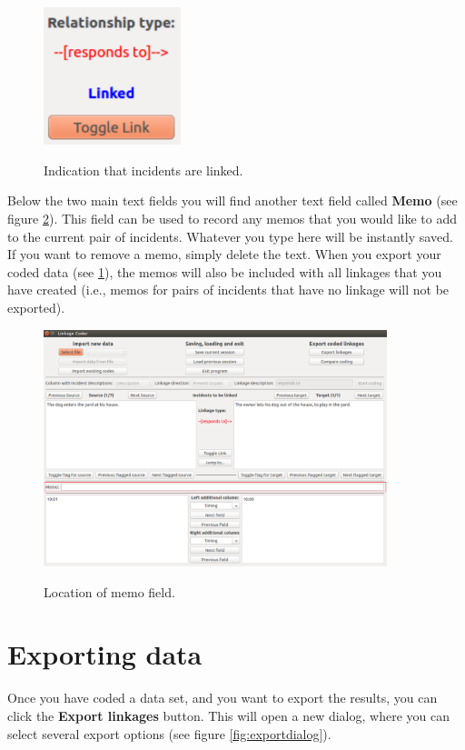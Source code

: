 \documentclass{memoir}
\begin{document}
\begin{figure}[h!]
  \centering
  \caption{Indication that incidents are linked.}
  \includegraphics[width=40mm]{Screenshot_10.pdf}
  \label{fig:linkage}
\end{figure}

Below the two main text fields you will find another text field called \textbf{Memo} (see figure \ref{fig:memo}). This field can be used to record any memos that you would like to add to the current pair of incidents. Whatever you type here will be instantly saved. If you want to remove a memo, simply delete the text. When you export your coded data (see \ref{sec:exportingdata}), the memos will also be included with all linkages that you have created (i.e., memos for pairs of incidents that have no linkage will not be exported). 

\begin{figure}[h!]
  \centering
  \caption{Location of memo field.}
  \includegraphics[width=100mm]{Screenshot_11.pdf}
  \label{fig:memo}
\end{figure}


\section{Exporting data}
\label{sec:exportingdata}

Once you have coded a data set, and you want to export the results, you can click the \textbf{Export linkages} button. This will open a new dialog, where you can select several export options (see figure \ref{fig:exportdialog}).
\end{document}
